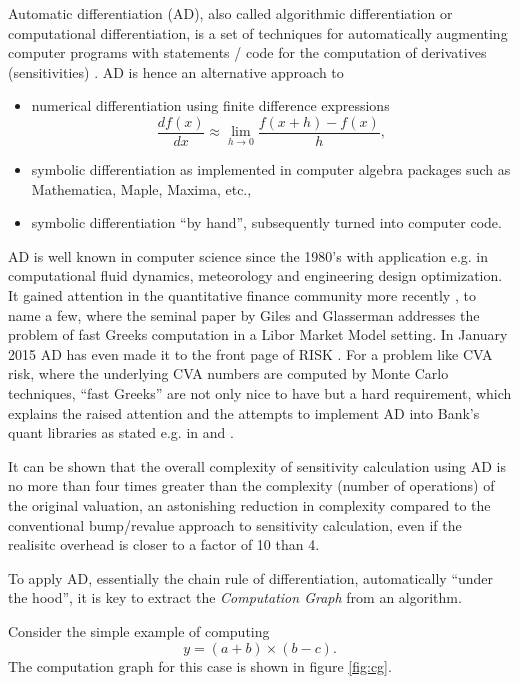 \documentclass[12pt, a4paper]{report}
\begin{document}
Automatic differentiation (AD), also called algorithmic differentiation or computational
differentiation, is a set of techniques for automatically augmenting computer programs with
statements / code for the computation of derivatives (sensitivities) \cite{autodiff}.
AD is hence an alternative approach to 
\begin{itemize}
\item numerical differentiation using
finite difference expressions 
$$
\frac{df(x)}{dx} \approx \lim_{h\rightarrow 0} \frac{f(x+h)-f(x)}{h},
$$
\item symbolic differentiation as implemented in computer algebra packages
such as Mathematica, Maple, Maxima, etc., 
\item symbolic differentiation ``by
hand'', subsequently turned into computer code. 
\end{itemize}

AD is well known in computer science since the 1980's with application e.g. in
computational fluid dynamics, meteorology and engineering design
optimization. It gained attention in the quantitative finance community more recently
\cite{giles_2006, leclerc_2009, joshi_2010, capriotti_2010,
  capriotti_2011, capriotti_2011b, capriotti_2011c}, to name a few, where the seminal paper by
Giles and Glasserman \cite{giles_2006} addresses the problem of fast Greeks computation
in a Libor Market Model setting. In January 2015 AD has even made it to the front
page of RISK \cite{sherif_2015}. For a problem like CVA risk, where the underlying
CVA numbers are computed by Monte Carlo techniques, ``fast Greeks''
are not only nice to have but a hard requirement, which explains the 
raised attention and the attempts to implement AD into Bank's quant libraries as stated e.g. in 
\cite{capriotti_2011b} and \cite{sherif_2015}.

It can be shown \cite{griewank_2000} that the overall
complexity of sensitivity calculation using AD is no more than
four times greater than the complexity (number of operations) of the original valuation,
an astonishing reduction in complexity compared to the conventional
bump/revalue approach to sensitivity calculation, even if the realisitc overhead is closer to a
factor of 10 than 4.

To apply AD, essentially the chain rule of differentiation, automatically ``under
the hood'', it is key to extract the {\em Computation Graph} from an algorithm.

Consider the simple example of computing
$$
y = (a + b) \times (b - c).
$$
The computation graph for this case is shown in figure \ref{fig:cg}.
\end{document}
